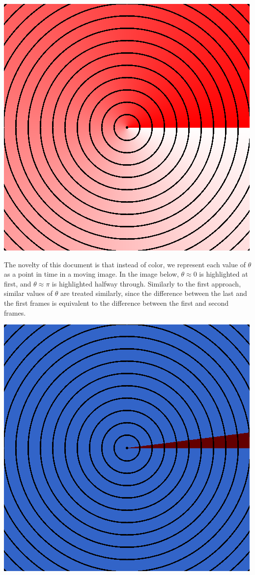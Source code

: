 \documentclass[xhtml, mathjax]{article}
\begin{document}
    \begin{center}
      \includegraphics{z_contour.gif}
    \end{center}

    The novelty of this document is that instead of color, we represent each
    value of $\theta$ as a point in time in a moving image. In the image below,
    $\theta \approx 0$ is highlighted at first, and $\theta \approx \pi$ is
    highlighted halfway through. Similarly to the first approach, similar values
    of $\theta$ are treated similarly, since the difference between the last and
    the first frames is equivalent to the difference between the first and
    second frames.

    \begin{center}
      \includegraphics{z_loop.gif}
    \end{center}
\end{document}
